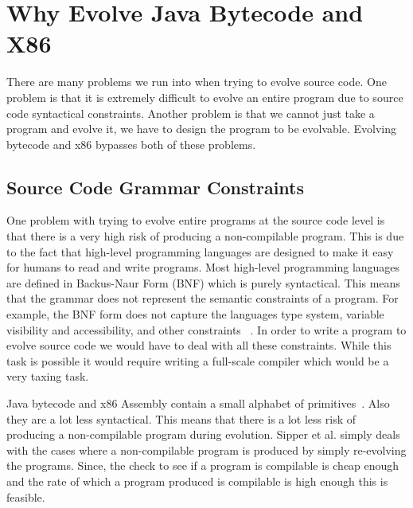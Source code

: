 \documentclass{sig-alternate}
\begin{document}
\section{Why Evolve Java Bytecode and X86}

There are many problems we run into when trying to evolve source code. One problem is that it is extremely difficult to evolve an entire program due to source code syntactical constraints. Another problem is that we cannot just take a program and evolve it, we have to design the program to be evolvable. Evolving bytecode and x86 bypasses both of these problems.


\subsection{Source Code Grammar Constraints}
One problem with trying to evolve entire programs at the source code level is that there is a very high risk of producing a non-compilable program. This is due to the fact that high-level programming languages are designed to make it easy for humans to read and write programs. Most high-level programming languages are defined in Backus-Naur Form (BNF) which is purely syntactical\cite{BNF:2014}\cite{FINCH:2011}. This means that the grammar does not represent the semantic constraints of a program. For example, the BNF form does not capture the languages type system, variable visibility and accessibility, and other constraints ~\cite{FINCH:2011}. In order to write a program to evolve source code we would have to deal with all these constraints. While this task is possible it would require writing a full-scale compiler which would be a very taxing task. \par

Java bytecode and x86 Assembly contain a small alphabet of primitives~\cite{Assembly:2010}. Also they are a lot less syntactical. This means that there is a lot less risk of producing a non-compilable program during evolution. Sipper et al.\cite{FINCH:2011} simply deals with the cases where a non-compilable program is produced by simply re-evolving the programs. Since, the check to see if a program is compilable is cheap enough and the rate of which a program produced is compilable is high enough this is feasible. 
\end{document}
